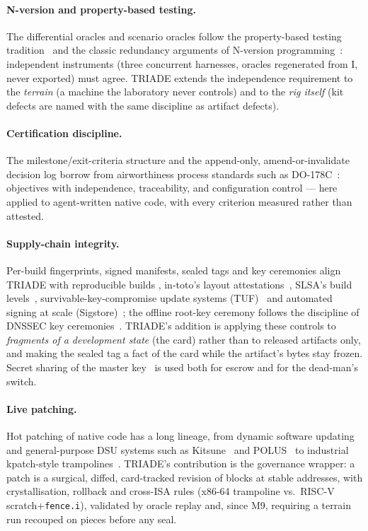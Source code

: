 \documentclass[11pt,a4paper]{article}
\newcommand{\code}[1]{\texttt{\small #1}}
\begin{document}
\paragraph{N-version and property-based testing.} The differential
oracles and scenario oracles follow the property-based testing
tradition~\cite{claessen2000} and the classic redundancy arguments of
N-version programming~\cite{avizienis1985}: independent instruments (three
concurrent harnesses, oracles regenerated from I, never exported) must
agree. TRIADE extends the independence requirement to the \emph{terrain}
(a machine the laboratory never controls) and to the \emph{rig itself}
(kit defects are named with the same discipline as artifact defects).

\paragraph{Certification discipline.} The milestone/exit-criteria
structure and the append-only, amend-or-invalidate decision log borrow
from airworthiness process standards such as
DO-178C~\cite{do178c}: objectives with independence, traceability, and
configuration control --- here applied to agent-written native code, with
every criterion measured rather than attested.

\paragraph{Supply-chain integrity.} Per-build fingerprints, signed
manifests, sealed tags and key ceremonies align TRIADE with
reproducible builds \cite{lamb2022}, in-toto's layout
attestations~\cite{intoto2019}, SLSA's build levels~\cite{slsa},
survivable-key-compromise update systems (TUF)~\cite{tuf2010} and
automated signing at scale (Sigstore)~\cite{sigstore2022}; the offline
root-key ceremony follows the discipline of DNSSEC key
ceremonies~\cite{rfc4033}. TRIADE's addition is applying these controls
to \emph{fragments of a development state} (the card) rather than to
released artifacts only, and making the sealed tag a fact of the card
while the artifact's bytes stay frozen. Secret sharing of the master
key~\cite{shamir1979} is used both for escrow and for the dead-man's
switch.

\paragraph{Live patching.} Hot patching of native code has a long
lineage, from dynamic software updating~\cite{hicks2002} and
general-purpose DSU systems such as Kitsune~\cite{hayden2012kitsune} and
POLUS~\cite{polusDSU} to industrial kpatch-style
trampolines~\cite{kpatch}. TRIADE's contribution is the
governance wrapper: a patch is a surgical, diffed, card-tracked revision
of blocks at stable addresses, with crystallisation, rollback and
cross-ISA rules (x86-64 trampoline vs.\ RISC-V scratch+\code{fence.i}),
validated by oracle replay and, since M9, requiring a terrain run
recouped on pieces before any seal.
\end{document}
